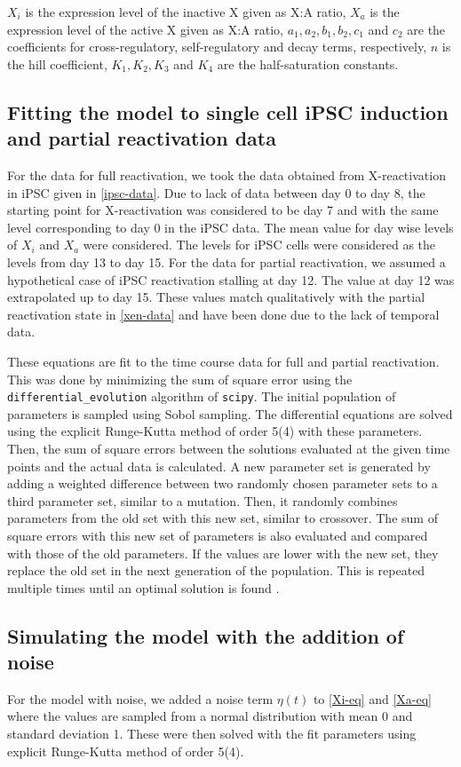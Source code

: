 \documentclass[11pt,a4paper]{article}
\renewcommand{\cite}{\parencite}
\begin{document}
$X_i$ is the expression level of the inactive X given as X:A ratio, $X_a$ is the expression level of the active X given as X:A ratio, $a_1, a_2, b_1, b_2, c_1$ and $c_2$ are the coefficients for cross-regulatory, self-regulatory and decay terms, respectively, $n$ is the hill coefficient, $K_1,K_2,K_3$ and $K_4$ are the half-saturation constants.

\subsection*{Fitting the model to single cell iPSC induction and partial reactivation data}
For the data for full reactivation, we took the data obtained from X-reactivation in iPSC given in \ref{ipsc-data}. Due to lack of data between day 0 to day 8, the starting point for X-reactivation was considered to be day 7 and with the same level corresponding to day 0 in the iPSC data. The mean value for day wise levels of $X_i$ and $X_a$ were considered. The levels for iPSC cells were considered as the levels from day 13 to day 15. For the data for partial reactivation, we assumed a hypothetical case of iPSC reactivation stalling at day 12. The value at day 12 was extrapolated up to day 15. These values match qualitatively with the partial reactivation state in \ref{xen-data} and have been done due to the lack of temporal data.

These equations are fit to the time course data for full and partial reactivation. This was done by minimizing the sum of square error using the \texttt{differential\_evolution} algorithm of \texttt{scipy}. The initial population of parameters is sampled using Sobol sampling. The differential equations are solved using the explicit Runge-Kutta method of order 5(4) with these parameters. Then, the sum of square errors between the solutions evaluated at the given time points and the actual data is calculated. A new parameter set is generated by adding a weighted difference between two randomly chosen parameter sets to a third parameter set, similar to a mutation. Then, it randomly combines parameters from the old set with this new set, similar to crossover. The sum of square errors with this new set of parameters is also evaluated and compared with those of the old parameters. If the values are lower with the new set, they replace the old set in the next generation of the population. This is repeated multiple times until an optimal solution is found \cite{DEalgo}.

\subsection*{Simulating the model with the addition of noise}
For the model with noise, we added a noise term $\eta(t)$ to \autoref{Xi-eq} and \autoref{Xa-eq} where the values are sampled from a normal distribution with mean 0 and standard deviation 1. These were then solved with the fit parameters using explicit Runge-Kutta method of order 5(4).
\end{document}

